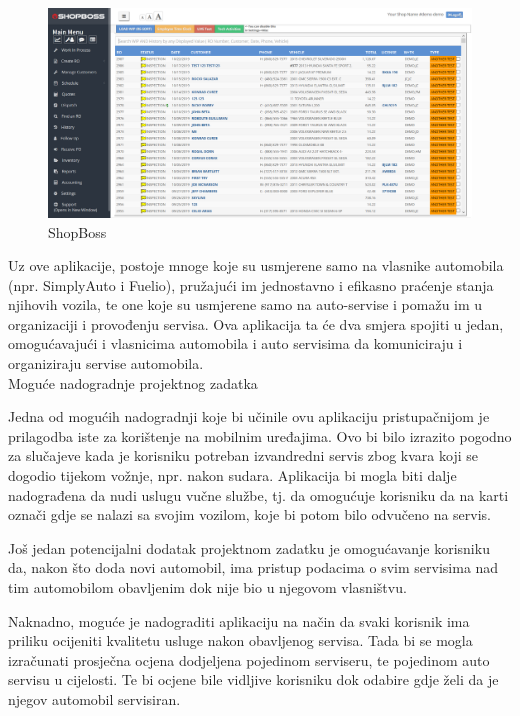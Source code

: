 		\begin{figure}[H]
			\includegraphics[scale=0.3]{slike/shopboss.PNG}
			\centering
			\caption{ShopBoss}
			\label{fig:idk1}
		\end{figure}
		
		Uz ove aplikacije, postoje mnoge koje su usmjerene samo na vlasnike automobila (npr. SimplyAuto i Fuelio), pružajući im jednostavno i efikasno praćenje stanja njihovih vozila, te one koje su usmjerene samo na auto-servise i pomažu im u organizaciji i provođenju servisa. Ova aplikacija ta će dva smjera spojiti u jedan, omogućavajući i vlasnicima automobila i auto servisima da komuniciraju i organiziraju servise automobila. \\
		
			\Large Moguće nadogradnje projektnog zadatka
		
		\normalsize Jedna od mogućih nadogradnji koje bi učinile ovu aplikaciju pristupačnijom je prilagodba iste za korištenje na mobilnim uređajima. Ovo bi bilo izrazito pogodno za slučajeve kada je korisniku potreban izvandredni servis zbog kvara koji se dogodio tijekom vožnje, npr. nakon sudara. Aplikacija bi mogla biti dalje nadograđena da nudi uslugu vučne službe, tj. da omogućuje korisniku da na karti označi gdje se nalazi sa svojim vozilom, koje bi potom bilo odvučeno na servis.
		
		Još jedan potencijalni dodatak projektnom zadatku je omogućavanje korisniku da, nakon što doda novi automobil, ima pristup podacima o svim servisima nad tim automobilom obavljenim dok nije bio u njegovom vlasništvu.
		
		Naknadno, moguće je nadograditi aplikaciju na način da svaki korisnik ima priliku ocijeniti kvalitetu usluge nakon obavljenog servisa. Tada bi se mogla izračunati prosječna ocjena dodjeljena pojedinom serviseru, te pojedinom auto servisu u cijelosti. Te bi ocjene bile vidljive korisniku dok odabire gdje želi da je njegov automobil servisiran.
		
